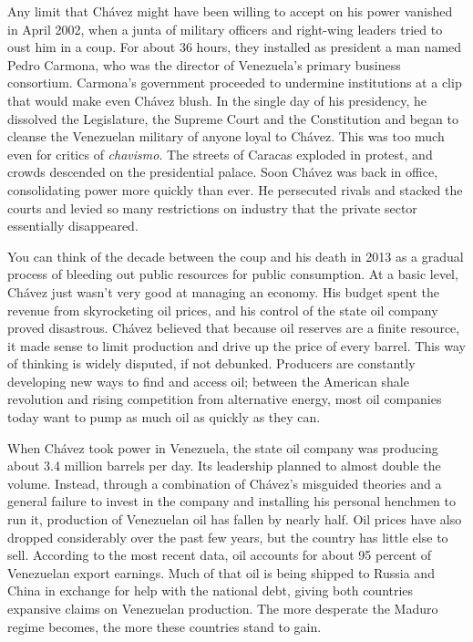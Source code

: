 Any limit that Chávez might have been willing to accept on his power
vanished in April 2002, when a junta of military officers and right-wing
leaders tried to oust him in a coup. For about 36 hours, they installed
as president a man named Pedro Carmona, who was the director of
Venezuela's primary business consortium. Carmona's government proceeded
to undermine institutions at a clip that would make even Chávez blush.
In the single day of his presidency, he dissolved the Legislature, the
Supreme Court and the Constitution and began to cleanse the Venezuelan
military of anyone loyal to Chávez. This was too much even for critics
of \emph{chavismo}. The streets of Caracas exploded in protest, and
crowds descended on the presidential palace. Soon Chávez was back in
office, consolidating power more quickly than ever. He persecuted rivals
and stacked the courts and levied so many restrictions on industry that
the private sector essentially disappeared.

You can think of the decade between the coup and his death in 2013 as a
gradual process of bleeding out public resources for public consumption.
At a basic level, Chávez just wasn't very good at managing an economy.
His budget spent the revenue from skyrocketing oil prices, and his
control of the state oil company proved disastrous. Chávez believed that
because oil reserves are a finite resource, it made sense to limit
production and drive up the price of every barrel. This way of thinking
is widely disputed, if not debunked. Producers are constantly developing
new ways to find and access oil; between the American shale revolution
and rising competition from alternative energy, most oil companies today
want to pump as much oil as quickly as they can.

When Chávez took power in Venezuela, the state oil company was producing
about 3.4 million barrels per day. Its leadership planned to almost
double the volume. Instead, through a combination of Chávez's misguided
theories and a general failure to invest in the company and installing
his personal henchmen to run it, production of Venezuelan oil has fallen
by nearly half. Oil prices have also dropped considerably over the past
few years, but the country has little else to sell. According to the
most recent data, oil accounts for about 95 percent of Venezuelan export
earnings. Much of that oil is being shipped to Russia and China in
exchange for help with the national debt, giving both countries
expansive claims on Venezuelan production. The more desperate the Maduro
regime becomes, the more these countries stand to gain.

